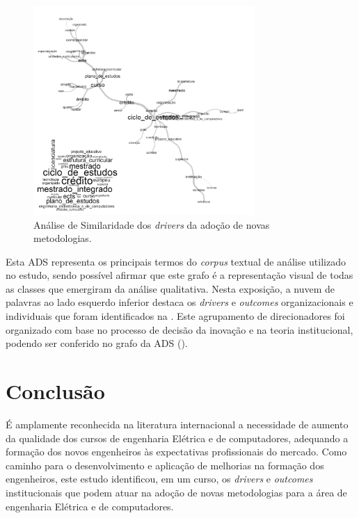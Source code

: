 \documentclass{textolivre}
\begin{document}
\begin{figure}[htbp]
 \centering
 \includegraphics[width=0.75\textwidth]{Fig05.png}
 \caption{Análise de Similaridade dos \textit{drivers} da adoção de novas metodologias.}
 \label{Fig05}
\end{figure}

Esta ADS representa os principais termos do \textit{corpus} textual de análise utilizado no estudo, sendo possível afirmar que este grafo é a representação visual de todas as classes que emergiram da análise qualitativa. Nesta exposição, a nuvem de palavras ao lado esquerdo inferior destaca os \textit{drivers} e \textit{outcomes} organizacionais e individuais que foram identificados na . Este agrupamento de direcionadores foi organizado com base no processo de decisão da inovação e na teoria institucional, podendo ser conferido no grafo da ADS ().

\section{Conclusão}\label{sec-conclusao}
É amplamente reconhecida na literatura internacional a necessidade de aumento da qualidade dos cursos de engenharia Elétrica e de computadores, adequando a formação dos novos engenheiros às expectativas profissionais do mercado. Como caminho para o desenvolvimento e aplicação de melhorias na formação dos engenheiros, este estudo identificou, em um curso, os \textit{drivers} e \textit{outcomes} institucionais que podem atuar na adoção de novas metodologias para a área de engenharia Elétrica e de computadores.
\end{document}
